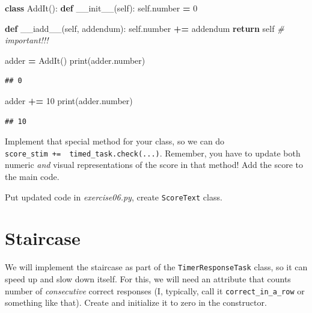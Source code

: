 \documentclass[
]{book}
\newenvironment{Shaded}{\begin{snugshade}}{\end{snugshade}}
\newcommand{\BuiltInTok}[1]{#1}
\newcommand{\CommentTok}[1]{\textcolor[rgb]{0.56,0.35,0.01}{\textit{#1}}}
\newcommand{\ControlFlowTok}[1]{\textcolor[rgb]{0.13,0.29,0.53}{\textbf{#1}}}
\newcommand{\DecValTok}[1]{\textcolor[rgb]{0.00,0.00,0.81}{#1}}
\newcommand{\FunctionTok}[1]{\textcolor[rgb]{0.00,0.00,0.00}{#1}}
\newcommand{\KeywordTok}[1]{\textcolor[rgb]{0.13,0.29,0.53}{\textbf{#1}}}
\newcommand{\NormalTok}[1]{#1}
\newcommand{\OperatorTok}[1]{\textcolor[rgb]{0.81,0.36,0.00}{\textbf{#1}}}
\newcommand{\VariableTok}[1]{\textcolor[rgb]{0.00,0.00,0.00}{#1}}
\begin{document}
\begin{Shaded}
\begin{Highlighting}[]
\KeywordTok{class}\NormalTok{ AddIt():}
    \KeywordTok{def} \FunctionTok{\_\_init\_\_}\NormalTok{(}\VariableTok{self}\NormalTok{):}
        \VariableTok{self}\NormalTok{.number }\OperatorTok{=} \DecValTok{0}
        
    \KeywordTok{def} \FunctionTok{\_\_iadd\_\_}\NormalTok{(}\VariableTok{self}\NormalTok{, addendum):}
        \VariableTok{self}\NormalTok{.number }\OperatorTok{+=}\NormalTok{ addendum}
        \ControlFlowTok{return} \VariableTok{self} \CommentTok{\# important!!!}


\NormalTok{adder }\OperatorTok{=}\NormalTok{ AddIt()}
\BuiltInTok{print}\NormalTok{(adder.number)}
\end{Highlighting}
\end{Shaded}

\begin{verbatim}
## 0
\end{verbatim}

\begin{Shaded}
\begin{Highlighting}[]
\NormalTok{adder }\OperatorTok{+=} \DecValTok{10}
\BuiltInTok{print}\NormalTok{(adder.number)}
\end{Highlighting}
\end{Shaded}

\begin{verbatim}
## 10
\end{verbatim}

Implement that special method for your class, so we can do \texttt{score\_stim\ +=\ \ timed\_task.check(...)}. Remember, you have to update both numeric \emph{and} visual representations of the score in that method! Add the score to the main code.

Put updated code in \emph{exercise06.py}, create \texttt{ScoreText} class.

\hypertarget{staircase}{%
\section{Staircase}\label{staircase}}

We will implement the staircase as part of the \texttt{TimerResponseTask} class, so it can speed up and slow down itself. For this, we will need an attribute that counts number of \emph{consecutive} correct responses (I, typically, call it \texttt{correct\_in\_a\_row} or something like that). Create and initialize it to zero in the constructor.
\end{document}
